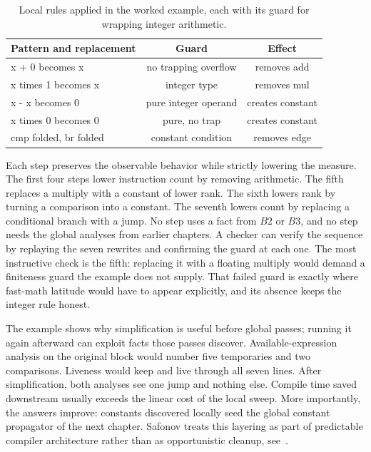 \begin{table}
\caption{Local rules applied in the worked example, each with its guard for wrapping integer arithmetic.}
\label{tab:ch13-rules}
\begin{tabular}{lcc}
\toprule
Pattern and replacement & Guard & Effect \\
\midrule
x + 0 becomes x & no trapping overflow & removes add \\
x times 1 becomes x & integer type & removes mul \\
x - x becomes 0 & pure integer operand & creates constant \\
x times 0 becomes 0 & pure, no trap & creates constant \\
cmp folded, br folded & constant condition & removes edge \\
\bottomrule
\end{tabular}
\end{table}

Each step preserves the observable behavior while strictly lowering the measure.
The first four steps lower instruction count by removing arithmetic.
The fifth replaces a multiply with a constant of lower rank.
The sixth lowers rank by turning a comparison into a constant.
The seventh lowers count by replacing a conditional branch with a jump.
No step uses a fact from $B2$ or $B3$, and no step needs the global analyses from earlier chapters.
A checker can verify the sequence by replaying the seven rewrites and confirming the guard at each one.
The most instructive check is the fifth: replacing it with a floating multiply would demand a finiteness guard the example does not supply.
That failed guard is exactly where fast-math latitude would have to appear explicitly, and its absence keeps the integer rule honest.

The example shows why simplification is useful before global passes; running it again afterward can exploit facts those passes discover.
Available-expression analysis on the original block would number five temporaries and two comparisons.
Liveness would keep  and  live through all seven lines.
After simplification, both analyses see one jump and nothing else.
Compile time saved downstream usually exceeds the linear cost of the local sweep.
More importantly, the answers improve: constants discovered locally seed the global constant propagator of the next chapter.
Safonov treats this layering as part of predictable compiler architecture rather than as opportunistic cleanup, see~\cite{safonov-2010-trustworthy}.

